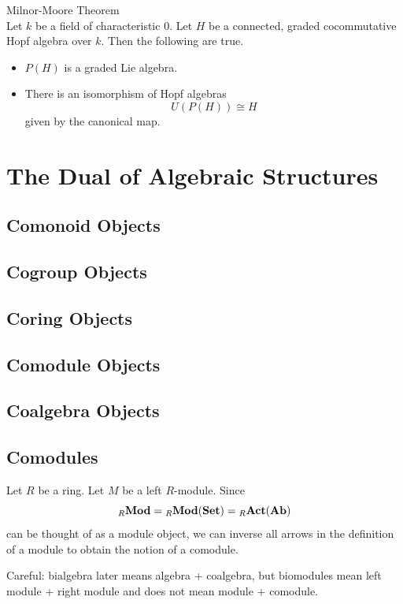 \documentclass[a4paper]{article}
\begin{document}
\begin{thm}{Milnor-Moore Theorem}{}\\
Let $k$ be a field of characteristic $0$. Let $H$ be a connected, graded cocommutative Hopf algebra over $k$. Then the following are true. 
\begin{itemize}
\item $P(H)$ is a graded Lie algebra. 
\item There is an isomorphism of Hopf algebras $$U(P(H))\cong H$$ given by the canonical map. 
\end{itemize}
\end{thm}

\pagebreak
\section{The Dual of Algebraic Structures}
\subsection{Comonoid Objects}

\subsection{Cogroup Objects}

\subsection{Coring Objects}

\subsection{Comodule Objects}

\subsection{Coalgebra Objects}

\subsection{Comodules}
Let $R$ be a ring. Let $M$ be a left $R$-module. Since $${_R}\bold{Mod}={_R}\bold{Mod}(\bold{Set})={_R}\bold{Act}(\bold{Ab})$$ can be thought of as a module object, we can inverse all arrows in the definition of a module to obtain the notion of a comodule. 

Careful: bialgebra later means algebra + coalgebra, but biomodules mean left module + right module and does not mean module + comodule. 
\end{document}
